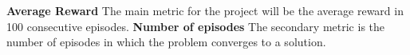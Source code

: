 \textbf{Average Reward} The main metric for the project will be the average reward in 100 consecutive episodes.
\newline
\textbf{Number of episodes} The secondary metric is the number of episodes in which the problem converges to a solution.